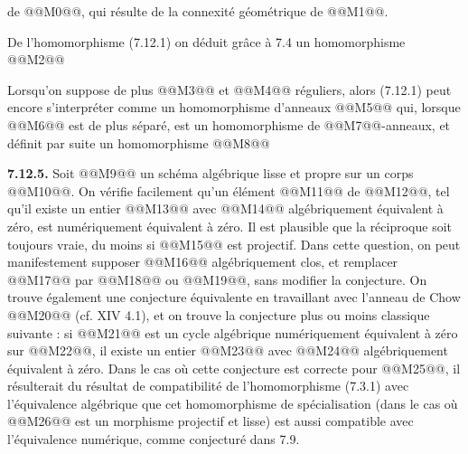 
de @@M0@@, qui résulte de la connexité géométrique de @@M1@@.

De l'homomorphisme (7.12.1) on déduit grâce à 7.4 un homomorphisme
@@M2@@

Lorsqu'on suppose de plus @@M3@@ et @@M4@@ réguliers, alors (7.12.1) peut encore s'interpréter comme un homomorphisme d'anneaux
@@M5@@
qui, lorsque @@M6@@ est de plus séparé, est un homomorphisme de @@M7@@-anneaux, et définit par suite un homomorphisme
@@M8@@

\textbf{7.12.5.} Soit @@M9@@ un schéma algébrique lisse et propre sur un corps @@M10@@. On vérifie facilement qu'un élément @@M11@@ de @@M12@@, tel qu'il existe un entier @@M13@@ avec @@M14@@ algébriquement équivalent à zéro, est numériquement équivalent à zéro. Il est plausible que la réciproque soit toujours vraie, du moins si @@M15@@ est projectif. Dans cette question, on peut manifestement supposer @@M16@@ algébriquement clos, et remplacer @@M17@@ par @@M18@@ ou @@M19@@, sans modifier la conjecture. On trouve également une conjecture équivalente en travaillant avec l'anneau de Chow @@M20@@ (cf. XIV 4.1), et on trouve la conjecture plus ou moins classique suivante : si @@M21@@ est un cycle algébrique numériquement équivalent à zéro sur @@M22@@, il existe un entier @@M23@@ avec @@M24@@ algébriquement équivalent à zéro. Dans le cas où cette conjecture est correcte pour @@M25@@, il résulterait du résultat de compatibilité de l'homomorphisme (7.3.1) avec l'équivalence algébrique que cet homomorphisme de spécialisation (dans le cas où @@M26@@ est un morphisme projectif et lisse) est aussi compatible avec l'équivalence numérique, comme conjecturé dans 7.9.

